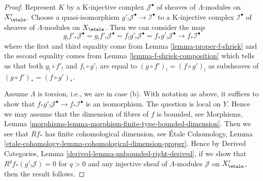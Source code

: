 \begin{proof}
Represent $K$ by a K-injective complex $\mathcal{J}^\bullet$ of
sheaves of $\Lambda$-modules on $X'_\etale$. Choose a quasi-isomorphism
$g'_!\mathcal{J}^\bullet \to \mathcal{I}^\bullet$ to a
K-injective complex $\mathcal{I}^\bullet$ of
sheaves of $\Lambda$-modules on $X_\etale$.
Then we can consider the map
$$
g_!f'_*\mathcal{J}^\bullet =
g_!f'_!\mathcal{J}^\bullet =
f_!g'_!\mathcal{J}^\bullet =
f_*g'_!\mathcal{J}^\bullet \to
f_*\mathcal{I}^\bullet
$$
where the first and third equality come from
Lemma \ref{lemma-proper-f-shriek}
and the second equality comes from
Lemma \ref{lemma-f-shriek-composition} which tells us that both
$g_! \circ f'_!$ and $f_! \circ g'_!$ are equal to
$(g \circ f')_! = (f \circ g')_!$ as subsheaves of
$(g \circ f')_* = (f \circ g')_*$.

\medskip\noindent
Assume $\Lambda$ is torsion, i.e., we are in case (b).
With notation as above, it suffices to show that
$f_*g'_!\mathcal{J}^\bullet \to f_*\mathcal{I}^\bullet$
is an isomorphism. The question is local on $Y$.
Hence we may assume that the dimension
of fibres of $f$ is bounded, see Morphisms, Lemma
\ref{morphisms-lemma-morphism-finite-type-bounded-dimension}.
Then we see that $Rf_*$ has finite cohomological dimension, see
\'Etale Cohomology, Lemma
\ref{etale-cohomology-lemma-cohomological-dimension-proper}.
Hence by Derived Categories, Lemma \ref{derived-lemma-unbounded-right-derived},
if we show that $R^qf_*(g'_!\mathcal{J}) = 0$ for $q > 0$
and any injective sheaf of $\Lambda$-modules $\mathcal{J}$
on $X'_\etale$, then the result follows.


\end{proof}
